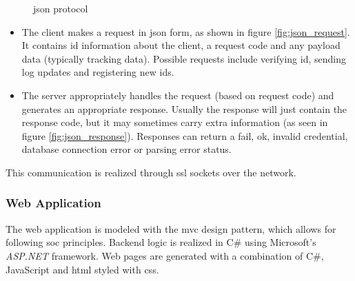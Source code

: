 \begin{figure}[H]
\centering
\caption{\Ac{json} protocol}
\label{fig:json_protocol}
\end{figure}


\begin{itemize}
\item The client makes a request in \ac{json} form, as shown in figure \ref{fig:json_request}.
It contains \ac{id} information about the client, a request code and any payload data (typically tracking data). Possible requests include verifying \ac{id}, sending log updates and registering new \ac{id}s.
\item The server appropriately handles the request (based on request code) and generates an appropriate response. Usually the response will just contain the response code, but it may sometimes carry extra information (as seen in figure \ref{fig:json_response}).
Responses can return a fail, ok, invalid credential, database connection error or parsing error status.
\end{itemize}

 This communication is realized through \ac{ssl} sockets over the network.

\pagebreak
\subsubsection{Web Application}
The web application is modeled with the \ac{mvc} design pattern, which allows for following \ac{soc} principles.
Backend logic is realized in C\# using Microsoft's \textit{ASP.NET} framework.
Web pages are generated with a combination of C\#, JavaScript and \ac{html} styled with \ac{css}.

